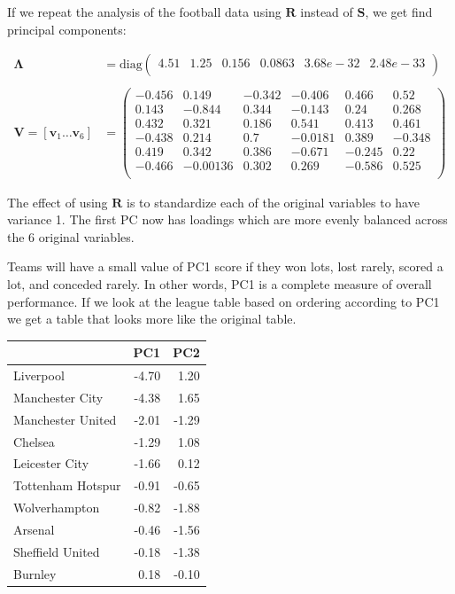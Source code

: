 \documentclass[]{book}
\theoremstyle{definition}
\theoremstyle{definition}
\theoremstyle{definition}
\theoremstyle{remark}
\begin{document}
If we repeat the analysis of the football data using \(\mathbf R\) instead of \(\mathbf S\), we get find principal components:

\begin{align*}
\boldsymbol \Lambda&= \text{diag}\begin{pmatrix}4.51&1.25&0.156&0.0863&3.68e-32&2.48e-33 \\\end{pmatrix}\\
\;\\
\mathbf V= [\mathbf v_1 \ldots \mathbf v_6] &=\begin{pmatrix}-0.456&0.149&-0.342&-0.406&0.466&0.52 \\0.143&-0.844&0.344&-0.143&0.24&0.268 \\0.432&0.321&0.186&0.541&0.413&0.461 \\-0.438&0.214&0.7&-0.0181&0.389&-0.348 \\0.419&0.342&0.386&-0.671&-0.245&0.22 \\-0.466&-0.00136&0.302&0.269&-0.586&0.525 \\\end{pmatrix}
\end{align*}

The effect of using \(\mathbf R\) is to standardize each of the original variables to have variance 1.
The first PC now has loadings which are more evenly balanced across the 6 original variables.

Teams will have a small value of PC1 score if they won lots, lost rarely, scored a lot, and conceded rarely. In other words, PC1 is a complete measure of overall performance. If we look at the league table based on ordering according to PC1 we get a table that looks more like the original table.

\begin{tabular}{lrr}
\toprule
  & PC1 & PC2\\
\midrule
Liverpool & -4.70 & 1.20\\
Manchester City & -4.38 & 1.65\\
Manchester United & -2.01 & -1.29\\
Chelsea & -1.29 & 1.08\\
Leicester City & -1.66 & 0.12\\
\addlinespace
Tottenham Hotspur & -0.91 & -0.65\\
Wolverhampton & -0.82 & -1.88\\
Arsenal & -0.46 & -1.56\\
Sheffield United & -0.18 & -1.38\\
Burnley & 0.18 & -0.10\\
\bottomrule
\end{tabular}
\end{document}
